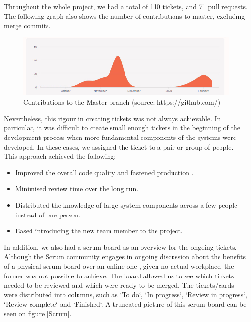 \documentclass[main.tex]{subfiles}
\begin{document}
Throughout the whole project, we had a total of 110 tickets, and 71 pull requests. The following graph also shows the number of contributions to master, excluding merge commits.

\begin{figure}[H]
   \centering
   \includegraphics[width=\textwidth]{05Coding/05Pictures/contributions.jpg}
   \caption{Contributions to the Master branch (source: https://github.com/)}
\end{figure}

Nevertheless, this rigour in creating tickets was not always achievable. In particular, it was difficult to create small enough tickets in the beginning of the development process when more fundamental components of the systems were developed. In these cases, we assigned the ticket to a pair or group of people. This approach achieved the following:

\begin{itemize}
    \item Improved the overall code quality and fastened production \cite{pairprogramming}.
    \item Minimised review time over the long run.
    \item Distributed the knowledge of large system components across a few people instead of one person.
    \item Eased introducing the new team member to the project.
\end{itemize}

In addition, we also had a scrum board as an overview for the ongoing tickets. Although the Scrum community engages in ongoing discussion about the benefits of a physical scrum board over an online one \cite{physicalscrum}, given no actual workplace, the former was not possible to achieve. The board allowed us to see which tickets needed to be reviewed and which were ready to be merged. The tickets/cards were distributed into columns, such as `To do`, `In progress`, `Review in progress`, `Review complete` and `Finished`. A truncated picture of this scrum board can be seen on figure \figurename{\ref{Scrum}}.
\end{document}
